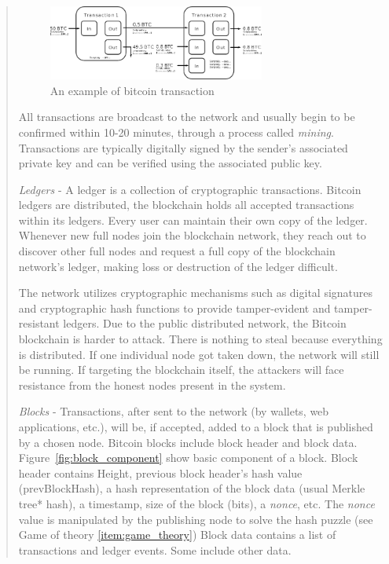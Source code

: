 \begin{itemize}
\begin{quote}
          \begin{figure}[ht!]
            \centering
            \includegraphics[width=0.7\textwidth]{images/transaction.png}
            \caption[An example of bitcoin transaction]{An example of bitcoin transaction}
            \label{fig:transaction}
          \end{figure}
          \bigbreak

          All transactions are broadcast to the network and usually begin to be confirmed within 10-20 minutes, through a process called \emph{mining}.
          Transactions are typically digitally signed by the sender’s associated private key and can be verified using the associated public key.

          \bigbreak

          \emph{Ledgers} -
          A ledger is a collection of cryptographic transactions.
          Bitcoin ledgers are distributed, the blockchain holds all accepted transactions within its ledgers. Every user can maintain their own copy of the ledger.
          Whenever new full nodes join the blockchain network, they reach out to discover other full nodes and request a full copy of the blockchain network’s ledger, making loss or destruction of the ledger difficult.
          \bigbreak

          The network utilizes cryptographic mechanisms such as digital signatures and cryptographic hash functions to provide tamper-evident and tamper-resistant ledgers.
          Due to the public distributed network, the Bitcoin blockchain is harder to attack. There is nothing to steal because everything is distributed. If one individual node got taken down, the network will still be running.
          If targeting the blockchain itself, the attackers will face resistance from the honest nodes present in the system.
          \bigbreak

          \emph{Blocks} -
          Transactions, after sent to the network (by wallets, web applications, etc.), will be, if accepted, added to a block that is published by a chosen node.
          Bitcoin blocks include block header and block data.
          Figure~\ref{fig:block_component} show basic component of a block.
          Block header contains Height, previous block header’s hash value (prevBlockHash), a hash representation of the block data (usual Merkle tree* hash), a timestamp, size of the block (bits), a \emph{nonce}, etc.
          The \emph{nonce} value is manipulated by the publishing node to solve the hash puzzle (see Game of theory \ref{item:game_theory})
          Block data contains a list of transactions and ledger events. Some include other data.
          \pagebreak


\end{quote}
\end{itemize}
